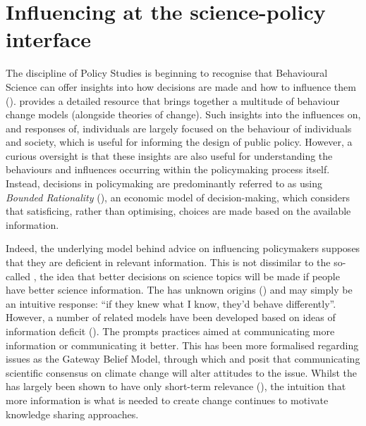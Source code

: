 \section{Influencing at the science-policy interface}\label{sec:litinfluencing}

The discipline of Policy Studies is beginning to recognise that Behavioural Science can offer insights into how decisions are made and how to influence them (\cite{CairneyW2017}). \textcite{Darnton2008} provides a detailed resource that brings together a multitude of behaviour change models (alongside theories of change). Such insights into the influences on, and responses of, individuals are largely focused on the behaviour of individuals and society, which is useful for informing the design of public policy. However, a curious oversight is that these insights are also useful for understanding the behaviours and influences occurring within the policymaking process itself. Instead, decisions in policymaking are predominantly referred to as using \emph{Bounded Rationality} (\cite{CairneyO2020,CairneyTS2023}), an economic model of decision-making, which considers that satisficing, rather than optimising, choices are made based on the available information. 

Indeed, the underlying model behind advice on influencing policymakers supposes that they are deficient in relevant information. This is not dissimilar to the so-called \IDM{}, the idea that better decisions on science topics will be made if people have better science information. The \IDM{} has unknown origins (\cite{Nerlich2017}) and may simply be an intuitive response: ``if they knew what I know, they'd behave differently''. However, a number of related models have been developed based on ideas of information deficit (\cite{Darnton2008}). The \IDM{} prompts practices aimed at communicating more information or communicating it better. This has been more formalised regarding \CAN{} issues as the Gateway Belief Model, through which \textcite{vanderLindenLFM2015} and \textcite{vanderLinden2021} posit that communicating scientific consensus on climate change will alter attitudes to the issue. Whilst the \IDM{} has largely been shown to have only short-term relevance (\cite[p24-5]{BA2024trust}), the intuition that more information is what is needed to create change continues to motivate knowledge sharing approaches.

